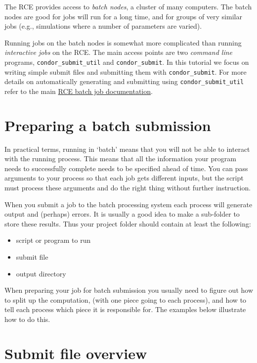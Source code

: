 \documentclass[]{book}
\providecommand{\tightlist}{%
  \setlength{\itemsep}{0pt}\setlength{\parskip}{0pt}}
\begin{document}
The RCE provides access to \emph{batch nodes}, a cluster of many
computers. The batch nodes are good for jobs will run for a long time,
and for groups of very similar jobs (e.g., simulations where a number of
parameters are varied).

Running jobs on the batch nodes is somewhat more complicated than
running \emph{interactive jobs} on the RCE. The main access points are
two \emph{command line} programs, \texttt{condor\_submit\_util} and
\texttt{condor\_submit}. In this tutorial we focus on writing simple
submit files and submitting them with \texttt{condor\_submit}. For more
details on automatically generating and submitting using
\texttt{condor\_submit\_util} refer to the main
\href{http://projects.iq.harvard.edu/rce/book/batch-processing-basics}{RCE
batch job documentation}.

\section{Preparing a batch
submission}\label{preparing-a-batch-submission}

In practical terms, running in `batch' means that you will not be able
to interact with the running process. This means that all the
information your program needs to successfully complete needs to be
specified ahead of time. You can pass arguments to your process so that
each job gets different inputs, but the script must process these
arguments and do the right thing without further instruction.

When you submit a job to the batch processing system each process will
generate output and (perhaps) errors. It is usually a good idea to make
a sub-folder to store these results. Thus your project folder should
contain at least the following:

\begin{itemize}
\tightlist
\item
  script or program to run
\item
  submit file
\item
  output directory
\end{itemize}

When preparing your job for batch submission you usually need to figure
out how to split up the computation, (with one piece going to each
process), and how to tell each process which piece it is responsible
for. The examples below illustrate how to do this.

\section{Submit file overview}\label{submit-file-overview}
\end{document}

